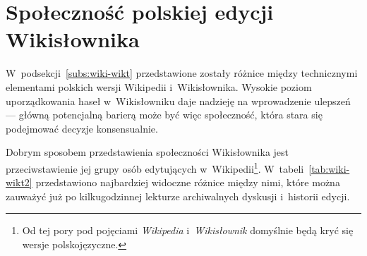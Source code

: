 \section{Społeczność polskiej edycji Wikisłownika}
\label{sec:plsoc}
W~podsekcji~\ref{subs:wiki-wikt} przedstawione zostały różnice między technicznymi elementami polskich wersji Wikipedii i~Wikisłownika. Wysokie poziom uporządkowania haseł w~Wikisłowniku daje nadzieję na wprowadzenie ulepszeń --- główną potencjalną barierą może być więc społeczność, która stara się podejmować decyzje konsensualnie.

Dobrym sposobem przedstawienia społeczności Wikisłownika jest przeciwstawienie jej grupy osób edytujących w~Wikipedii\footnote{Od tej pory pod pojęciami \emph{Wikipedia} i~\emph{Wikisłownik} domyślnie będą kryć się wersje polskojęzyczne.}. W~tabeli~\ref{tab:wiki-wikt2} przedstawiono najbardziej widoczne różnice między nimi, które można zauważyć już po kilkugodzinnej lekturze archiwalnych dyskusji i~historii edycji.

